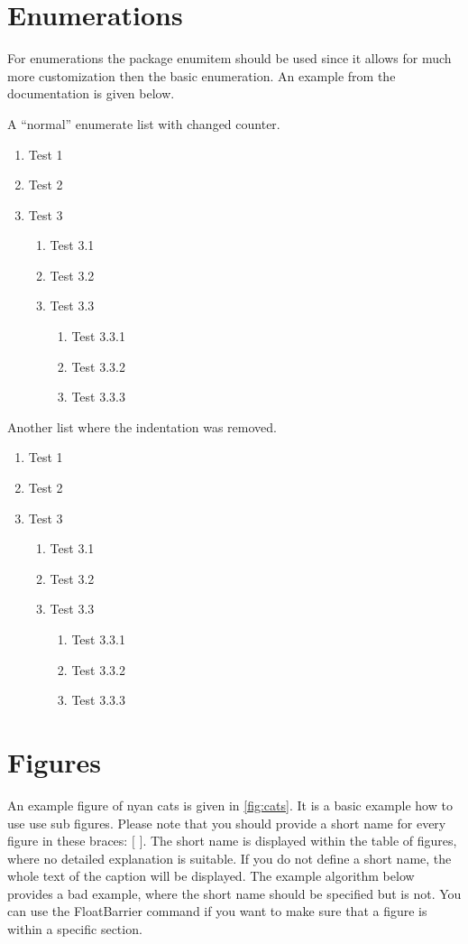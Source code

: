 \documentclass[12pt, %
               a4paper, %
               twoside, %
               openright, %
               abstract=on, %
               DIV=11,      %
               BCOR=8mm]{scrbook} %
\begin{document}
\section{Enumerations}
For enumerations the package enumitem should be used since it allows for much more customization then the basic enumeration.
An example from the documentation is given below.


A ``normal'' enumerate list with changed counter.
\begin{enumerate}[label=\alph*)]
	\item Test 1
	\item Test 2
	\item Test 3
		\begin{enumerate}[label=\arabic*)]
			\item Test 3.1
			\item Test 3.2
			\item Test 3.3
				\begin{enumerate}[label=\Roman*)]
					\item Test 3.3.1
					\item Test 3.3.2
					\item Test 3.3.3
				\end{enumerate}
		\end{enumerate}
\end{enumerate}

Another list where the indentation was removed.
\begin{enumerate}[leftmargin=0em, label=\alph*)]
	\item Test 1
	\item Test 2
	\item Test 3
		\begin{enumerate}[label=\arabic*)]
			\item Test 3.1
			\item Test 3.2
			\item Test 3.3
				\begin{enumerate}[label=\Roman*)]
					\item Test 3.3.1
					\item Test 3.3.2
					\item Test 3.3.3
				\end{enumerate}
		\end{enumerate}
\end{enumerate}


\section{Figures}
An example figure of nyan cats is given in \cref{fig:cats}.
It is a basic example how to use use sub figures.
Please note that you should provide a short name for every figure in these braces: $[$ $]$.
The short name is displayed within the table of figures, where no detailed explanation is suitable.
If you do not define a short name, the whole text of the caption will be displayed.
The example algorithm below provides a bad example, where the short name should be specified but is not.
You can use the FloatBarrier command if you want to make sure that a figure is within a specific section.
\end{document}
